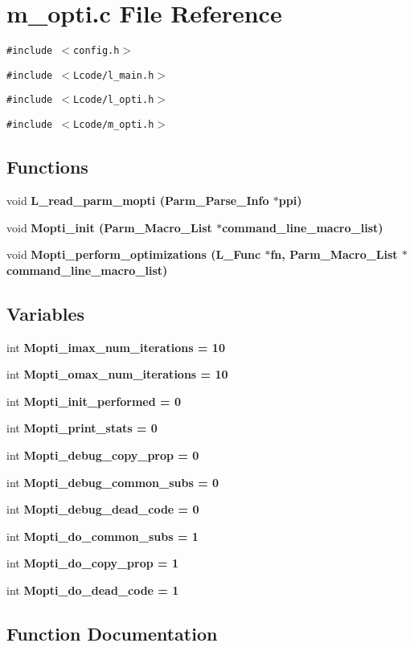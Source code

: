 \section{m\_\-opti.c File Reference}
\label{m__opti_8c}
{\tt \#include $<$config.h$>$}\par
{\tt \#include $<$Lcode/l\_\-main.h$>$}\par
{\tt \#include $<$Lcode/l\_\-opti.h$>$}\par
{\tt \#include $<$Lcode/m\_\-opti.h$>$}\par
\subsection*{Functions}
\begin{CompactItemize}
\item 
void \bf{L\_\-read\_\-parm\_\-mopti} (Parm\_\-Parse\_\-Info $\ast$ppi)
\item 
void \bf{Mopti\_\-init} (Parm\_\-Macro\_\-List $\ast$command\_\-line\_\-macro\_\-list)
\item 
void \bf{Mopti\_\-perform\_\-optimizations} (L\_\-Func $\ast$fn, Parm\_\-Macro\_\-List $\ast$command\_\-line\_\-macro\_\-list)
\end{CompactItemize}
\subsection*{Variables}
\begin{CompactItemize}
\item 
int \bf{Mopti\_\-imax\_\-num\_\-iterations} = 10
\item 
int \bf{Mopti\_\-omax\_\-num\_\-iterations} = 10
\item 
int \bf{Mopti\_\-init\_\-performed} = 0
\item 
int \bf{Mopti\_\-print\_\-stats} = 0
\item 
int \bf{Mopti\_\-debug\_\-copy\_\-prop} = 0
\item 
int \bf{Mopti\_\-debug\_\-common\_\-subs} = 0
\item 
int \bf{Mopti\_\-debug\_\-dead\_\-code} = 0
\item 
int \bf{Mopti\_\-do\_\-common\_\-subs} = 1
\item 
int \bf{Mopti\_\-do\_\-copy\_\-prop} = 1
\item 
int \bf{Mopti\_\-do\_\-dead\_\-code} = 1
\end{CompactItemize}


\subsection{Function Documentation}
